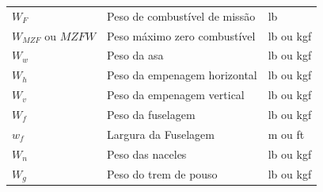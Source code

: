 \begin{longtable}{p{} p{} p{}}
$W_F$ & Peso de combustível de missão & lb \\
$W_{MZF}$ ou $MZFW$ & Peso máximo zero combustível & lb ou kgf \\
$W_w$ & Peso da asa & lb ou kgf \\
$W_h$ & Peso da empenagem horizontal & lb ou kgf \\
$W_v$ & Peso da empenagem vertical & lb ou kgf \\
$W_f$ & Peso da fuselagem & lb ou kgf \\
$w_f$ & Largura da Fuselagem & m ou ft \\
$W_n$ & Peso das naceles & lb ou kgf \\
$W_g$ & Peso do trem de pouso & lb ou kgf \\ 
\hline
\end{longtable}

